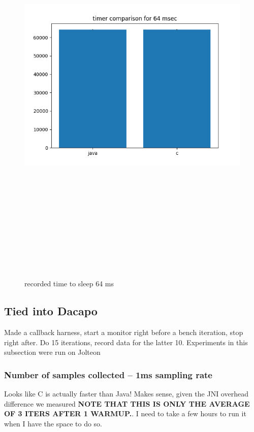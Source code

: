 \documentclass{article}
\begin{document}
    \begin{figure}[H]
    	\centering
    	\includegraphics[width=17cm,height=20cm,keepaspectratio]{AsyncMonitorCompares/sleep-timer_java-vs-c/time-compare-64.png}
    	\caption{recorded time to sleep 64 ms}
    	\label{fig:xalan-fix-PKG}
    \end{figure}


\subsection{Tied into Dacapo}
Made a callback harness, start a monitor right before a bench iteration, stop right after. Do 15 iterations, record data for the
latter 10. Experiments in this subsection were run on Jolteon

\subsubsection{Number of samples collected -- 1ms sampling rate}
Looks like C is actually faster than Java! Makes sense, given the JNI overhead difference we measured \textbf{NOTE THAT THIS IS ONLY THE AVERAGE OF 3 ITERS AFTER 1 WARMUP.}. I need to take a few hours to run it when I have the space to do so.
\end{document}
